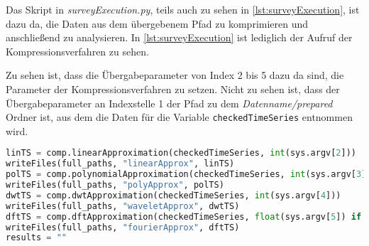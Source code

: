 Das Skript in \textit{surveyExecution.py}, teils auch zu sehen in \autoref{lst:surveyExecution}, ist dazu da, die Daten aus dem übergebenem Pfad zu komprimieren und anschließend zu analysieren. In \autoref{lst:surveyExecution} ist lediglich der Aufruf der Kompressionsverfahren zu sehen. 

Zu sehen ist, dass die Übergabeparameter von Index 2 bis 5 dazu da sind, die Parameter der Kompressionsverfahren zu setzen. Nicht zu sehen ist, dass der Übergabeparameter an Indexstelle 1 der Pfad zu dem \textit{Datenname/prepared} Ordner ist, aus dem die Daten für die Variable \lstinline|checkedTimeSeries| entnommen wird.
\begin{lstlisting}[caption=Funktion zur Zeitmessung, language=Python, label=lst:surveyExecution, style=Python]
linTS = comp.linearApproximation(checkedTimeSeries, int(sys.argv[2]))
writeFiles(full_paths, "linearApprox", linTS)
polTS = comp.polynomialApproximation(checkedTimeSeries, int(sys.argv[3]))
writeFiles(full_paths, "polyApprox", polTS)
dwtTS = comp.dwtApproximation(checkedTimeSeries, int(sys.argv[4]))
writeFiles(full_paths, "waveletApprox", dwtTS)
dftTS = comp.dftApproximation(checkedTimeSeries, float(sys.argv[5]) if len(sys.argv) == 6 else 10)
writeFiles(full_paths, "fourierApprox", dftTS)
results = ""
\end{lstlisting}